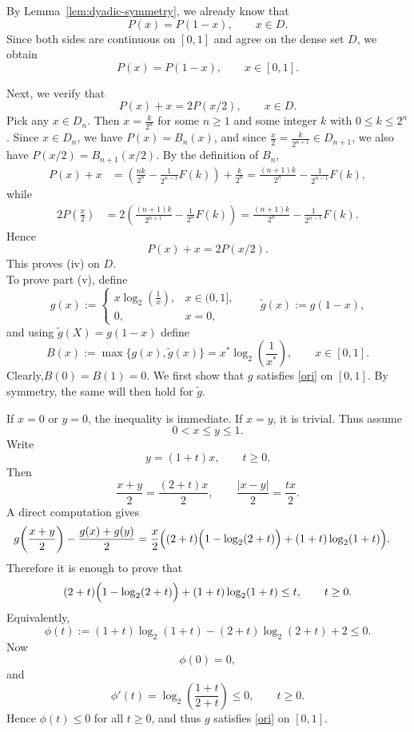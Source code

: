 \documentclass[11pt]{amsart}
\theoremstyle{definition}
\renewcommand{\1}{{\mathbbm{1}}}
\begin{document}
By Lemma~\ref{lem:dyadic-symmetry}, we already know that
\[
P(x)=P(1-x),\qquad x\in D.
\]
Since both sides are continuous on $[0,1]$ and agree on the dense set $D$, we obtain
\[
P(x)=P(1-x),\qquad x\in[0,1].
\]

Next, we verify that
\[
P(x)+x=2P(x/2),\qquad x\in D.
\]
Pick any $x\in D_n$. Then $x=\frac{k}{2^n}$ for some $n\ge 1$ and some integer $k$ with $0\le k\le 2^n$. Since $x\in D_n$, we have $P(x)=B_n(x)$, and since $\frac{x}{2}=\frac{k}{2^{n+1}}\in D_{n+1}$, we also have
$P(x/2)=B_{n+1}(x/2)$. By the definition of $B_n$,
\begin{align*}
P(x)+x
&=\left(\frac{nk}{2^n}-\frac{1}{2^{n-1}}F(k)\right)+\frac{k}{2^n}=\frac{(n+1)k}{2^n}-\frac{1}{2^{n-1}}F(k),
\end{align*}
while
\begin{align*}
2P\!\left(\frac{x}{2}\right)
&=2\left(\frac{(n+1)k}{2^{n+1}}-\frac{1}{2^n}F(k)\right)=\frac{(n+1)k}{2^n}-\frac{1}{2^{n-1}}F(k).
\end{align*}
Hence
\[
P(x)+x=2P(x/2).
\]
This proves (iv) on $D$.\\



To prove part (v), define
\[
g(x):=
\begin{cases}
x\log_2\!\left(\frac1x\right),& x\in(0,1],\\[1mm]
0,& x=0,
\end{cases}
\qquad
\widetilde g(x):=g(1-x),
\]
and using $\tilde{g}(X)=g(1-x)$ define
\[
B(x):=\max\{g(x),\widetilde g(x)\}
      =x^*\log_2\!\left(\frac1{x^*}\right),
\qquad x\in[0,1].
\]
Clearly,$
B(0)=B(1)=0.$
We first show that $g$ satisfies \eqref{ori} on $[0,1]$. By symmetry, the same will then
hold for $\widetilde g$.

If $x=0$ or $y=0$, the inequality is immediate. If $x=y$, it is trivial. Thus assume
\[
0<x\le y\le 1.
\]
Write
\[
y=(1+t)x,\qquad t\ge0.
\]
Then
\[
\frac{x+y}{2}=\frac{(2+t)x}{2},
\qquad
\frac{|x-y|}{2}=\frac{tx}{2}.
\]
A direct computation gives
\begin{align*}
g\!\left(\frac{x+y}{2}\right)-\frac{g(x)+g(y)}{2}
&=
\frac{x}{2}\Bigl((2+t)\Bigl(1-\log_2(2+t)\Bigr)+(1+t)\log_2(1+t)\Bigr).
\end{align*}
Therefore it is enough to prove that
\[
(2+t)\Bigl(1-\log_2(2+t)\Bigr)+(1+t)\log_2(1+t)\le t,
\qquad t\ge0.
\]
Equivalently,
\[
\phi(t):=(1+t)\log_2(1+t)-(2+t)\log_2(2+t)+2\le0.
\]
Now
\[
\phi(0)=0,
\]
and
\[
\phi'(t)=\log_2\!\left(\frac{1+t}{2+t}\right)\le0,\qquad t\ge0.
\]
Hence $\phi(t)\le0$ for all $t\ge0$, and thus $g$ satisfies \eqref{ori} on $[0,1]$.
\end{document}

